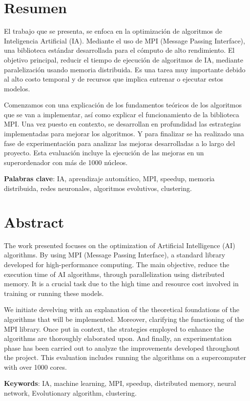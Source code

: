 \chapter*{Resumen}

El trabajo que se presenta, se enfoca en la optimización de algoritmos de Inteligencia  Artificial (IA). Mediante el uso de MPI (Message Passing Interface), una biblioteca estándar desarrollada para el cómputo de alto rendimiento. 
El objetivo principal, reducir el tiempo de ejecución de algoritmos de IA, mediante paralelización usando memoria distribuida. Es una tarea muy importante debido al alto costo temporal y de recursos que implica entrenar o ejecutar estos modelos.

Comenzamos con una explicación de los fundamentos teóricos de los algoritmos que se van a implementar, así como explicar el funcionamiento de la biblioteca MPI. 
Una vez puesto en contexto, se desarrollan en profundidad las estrategias implementadas para mejorar los algoritmos.
Y para finalizar se ha realizado una fase de experimentación para analizar las mejoras desarrolladas a lo largo del proyecto. Esta evaluación incluye la ejecución de las mejoras en un superordenador con más de 1000 núcleos.	

\vspace{4cm} %

\textbf{Palabras clave}: IA, aprendizaje automático, MPI, speedup, memoria distribuida, redes neuronales, algoritmos evolutivos, clustering.



\chapter*{Abstract}

The work presented focuses on the optimization of Artificial Intelligence (AI) algorithms. By using MPI (Message Passing Interface), a standard library developed for high-performance computing.
The main objective, reduce the execution time of AI algorithms, through parallelization using distributed memory. It is a crucial task due to the high time and resource cost involved in training or running these models.

We initiate develving with an explanation of the theoretical foundations of the algorithms that will be implemented. Moreover, clarifying the functioning of the MPI library.
Once put in context, the strategies employed to enhance the algorithms are thoroughly elaborated upon.
And finally, an experimentation phase has been carried out to analyze the improvements developed throughout the project. This evaluation includes running the algorithms on a supercomputer with over 1000 cores.


\vspace{4cm} %

\textbf{Keywords}: IA, machine learning, MPI, speedup, distributed memory, neural network, Evolutionary algorithm, clustering.



